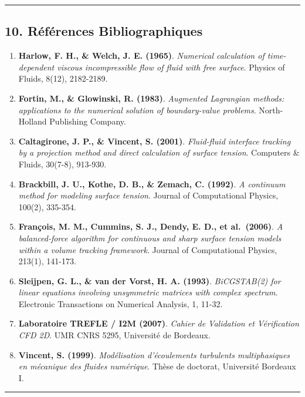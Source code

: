 \documentclass[
  french,
]{article}
\providecommand{\tightlist}{%
  \setlength{\itemsep}{0pt}\setlength{\parskip}{0pt}}
\begin{document}
\begin{center}\rule{0.5\linewidth}{0.5pt}\end{center}

\subsection{10. Références
Bibliographiques}\label{ruxe9fuxe9rences-bibliographiques}

\begin{enumerate}
\def\labelenumi{\arabic{enumi}.}
\tightlist
\item
  \textbf{Harlow, F. H., \& Welch, J. E. (1965)}. \emph{Numerical
  calculation of time-dependent viscous incompressible flow of fluid
  with free surface}. Physics of Fluids, 8(12), 2182-2189.
\item
  \textbf{Fortin, M., \& Glowinski, R. (1983)}. \emph{Augmented
  Lagrangian methods: applications to the numerical solution of
  boundary-value problems}. North-Holland Publishing Company.
\item
  \textbf{Caltagirone, J. P., \& Vincent, S. (2001)}. \emph{Fluid-fluid
  interface tracking by a projection method and direct calculation of
  surface tension}. Computers \& Fluids, 30(7-8), 913-930.
\item
  \textbf{Brackbill, J. U., Kothe, D. B., \& Zemach, C. (1992)}. \emph{A
  continuum method for modeling surface tension}. Journal of
  Computational Physics, 100(2), 335-354.
\item
  \textbf{François, M. M., Cummins, S. J., Dendy, E. D., et al.~(2006)}.
  \emph{A balanced-force algorithm for continuous and sharp surface
  tension models within a volume tracking framework}. Journal of
  Computational Physics, 213(1), 141-173.
\item
  \textbf{Sleijpen, G. L., \& van der Vorst, H. A. (1993)}.
  \emph{BiCGSTAB(2) for linear equations involving unsymmetric matrices
  with complex spectrum}. Electronic Transactions on Numerical Analysis,
  1, 11-32.
\item
  \textbf{Laboratoire TREFLE / I2M (2007)}. \emph{Cahier de Validation
  et Vérification CFD 2D}. UMR CNRS 5295, Université de Bordeaux.
\item
  \textbf{Vincent, S. (1999)}. \emph{Modélisation d'écoulements
  turbulents multiphasiques en mécanique des fluides numérique}. Thèse
  de doctorat, Université Bordeaux I.
\end{enumerate}

\begin{center}\rule{0.5\linewidth}{0.5pt}\end{center}
\end{document}
